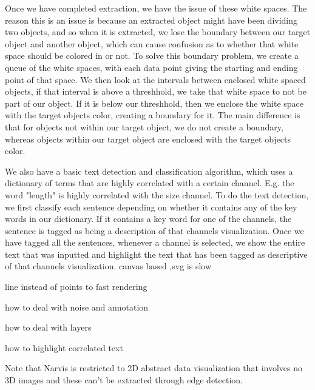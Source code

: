 \documentclass[review,journal]{vgtc}         %
\begin{document}
Once we have completed extraction, we have the issue of these white spaces. The reason this is an issue is because an extracted object might have been dividing two objects, and so when it is extracted, we lose the boundary between our target object and another object, which can cause confusion as to whether that white space should be colored in or not. To solve this boundary problem, we create a queue of the white spaces, with each data point giving the starting and ending point of that space. We then look at the intervals between enclosed white spaced objects, if that interval is above a threshhold, we take that white space to not be part of our object. If it is below our threshhold, then we enclose the white space with the target objects color, creating a boundary for it. The main difference is that for objects not within our target object, we do not create a boundary, whereas objects within our target object are enclosed with the target objects color.\par
We also have a basic text detection and classification algorithm, which uses a dictionary of terms that are highly correlated with a certain channel. E.g. the word "length" is highly correlated with the size channel. To do the text detection, we first classify each sentence depending on whether it contains any of the key words in our dictionary. If it contains a key word for one of the channels, the sentence is tagged as being a description of that channels visualization. Once we have tagged all the sentences, whenever a channel is selected, we show the entire text that was inputted and highlight the text that has been tagged as descriptive of that channels visualization.
canvas based ,svg is slow\par
line instead of points to fast rendering \par
how to deal with noise and annotation \par
how to deal with layers \par
how to highlight correlated text \par
Note that Narvis is restricted to 2D abstract data visualization that involves no 3D images and these can't be extracted through edge detection. 
\end{document}

